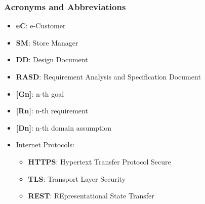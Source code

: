 \subsubsection{Acronyms and Abbreviations}
\begin{itemize}[itemsep=-1mm, topsep=-1mm]
	\item \textbf{eC}: e-Customer
	\item \textbf{SM}: Store Manager
	\item \textbf{DD}: Design Document
	\item \textbf{RASD}: Requirement Analysis and Specification Document
	\item \textbf{[Gn]}: n-th goal
	\item \textbf{[Rn]}: n-th requirement
	\item \textbf{[Dn]}: n-th domain assumption
	\item Internet Protocols:
	\begin{itemize}[itemsep=-1mm, topsep=-1mm]
		\item \textbf{HTTPS}: Hypertext Transfer Protocol Secure 
		\item \textbf{TLS}: Transport Layer Security
		\item \textbf{REST}: REpresentational State Transfer
	\end{itemize}
\end{itemize}	